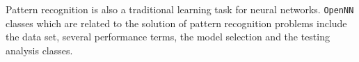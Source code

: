 Pattern recognition is also a traditional learning task for neural networks. 
\texttt{OpenNN} classes which are related to the solution of pattern recognition problems include the data set, 
several performance terms, the model selection and the testing analysis classes. 

